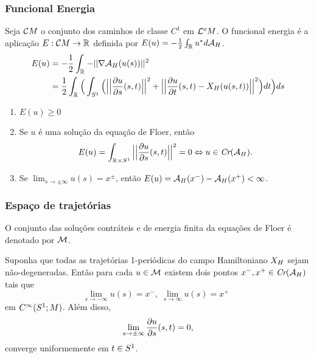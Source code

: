 \documentclass{beamer}
\begin{document}
	\begin{frame}
		\frametitle{Funcional Energia}
		
		Seja $\mathcal{C}M$ o conjunto dos caminhos de classe $C^{1}$ em $\mathcal{L}^{o}M$. O funcional energia é a aplicação $E: \mathcal{C}M \to \mathbb{R}^{}$ definida por $E(u)
		=-\frac{1}{2}\int_{\mathbb{R}^{}}u^{*}d\mathcal{A}_{H}$.
		$$
		\begin{aligned}
			E(u) &= -\frac{1}{2}\int_{\mathbb{R}^{}}-||\nabla \mathcal{A}_{H}(u(s))||^{2}
			\\
			&= \frac{1}{2}\int_{\mathbb{R}^{}}\Big(  \int_{S^{1}} \Big( \Big|\Big|\frac{\partial u}{\partial s}(s,t)\Big|\Big|^{2} + \Big|\Big|\frac{\partial u}{\partial t}(s,t) - X_{H}(u(s,t))\Big|\Big|^{2} \Big) dt  \Big)ds
		\end{aligned}
		$$
		
		\begin{enumerate}
			\item $E(u)\geq0$
			
			\item Se $u$ é uma solução da equação de Floer, então
			$$
			E(u)=\int_{\mathbb{R}^{} \times S^{1}}\Big|\Big|\frac{\partial u}{\partial s}(s,t)\Big|\Big|^{2} =0 \Leftrightarrow u \in \textit{Cr}(\mathcal{A}_{H}).
			$$
			
			\item Se $\lim_{s\to \pm\infty}u(s)=x^{\pm}$, então $E(u)=\mathcal{A}_{H}(x^{-}) - \mathcal{A}_{H}(x^{+})<\infty$.
		\end{enumerate}
	\end{frame}

	\begin{frame}
		\frametitle{Espaço de trajetórias}
		O conjunto das soluções contráteis e de energia finita da equações de Floer é denotado por $\mathcal{M}$.
		
		\begin{teorema}\label{teorema_limite_solucoes_energia_finita}
			Suponha que todas as trajetórias 1-periódicas do campo Hamiltoniano $X_{H}$ sejam não-degeneradas. Então para cada $u \in \mathcal{M}$ existem dois pontos $x^{-}, x^{+}\in \textit{Cr}(\mathcal{A}_{H})$ tais que
			$$
			\lim_{s\to -\infty}u(s)=x^{-},\; \lim_{s\to \infty}u(s)=x^{+}\;\;
			$$
			em $C^{\infty}(S^{1};M)$. Além disso, 
			$$
			\lim_{s\to \pm \infty}\frac{\partial u}{\partial s}(s,t) = 0,
			$$
			converge uniformemente em $t\in S^{1}$.
		\end{teorema}
		
	\end{frame}
	
\end{document}

